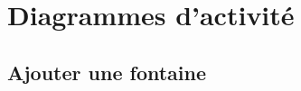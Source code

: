 \documentclass{EPL-master-thesis-covers-FR}
\begin{document}

		
		




		

		\label{sec:wireframes}

		

	\chapter{Diagrammes d'activité}

		\label{sec:activity_diag}

		\section*{Ajouter une fontaine}
\end{document}
